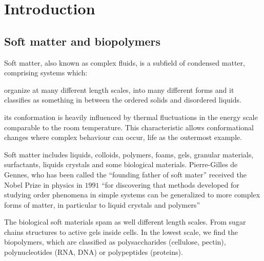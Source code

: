 
\chapter{Introduction} %

\label{Introduction} %



    
    

\section{Soft matter and biopolymers}
Soft matter, also known as complex fluids, is a subfield of condensed
matter, comprising systems which:
\begin{enumerate*}[label=\bfseries\alph*)]
 
\item organize at many different length scales, into
many different forms and it classifies as something in between the
ordered solids and disordered liquids.\
\item its conformation is heavily
influenced by thermal fluctuations in the energy scale comparable to the room
temperature. This characteristic allows conformational changes where complex
behaviour can occur, life as the outermost example.
\end{enumerate*}

Soft matter includes liquids, colloids, polymers, foams, gels, granular
materials, surfactants, liquids crystals and some biological materials.
Pierre-Gilles de Gennes, who has been called the ``founding father of soft
mater'' received the Nobel Prize in physics in $1991$ ``for discovering that 
methods developed for studying order phenomena in simple systems can be 
generalized to more complex forms of matter, in particular to liquid  crystals
and polymers''\citep{de_gennes_pierre-gilles_????}
 
The biological soft materials spam as well different length scales. From sugar
chains structures to active gels inside cells. In the
lowest scale, we find the biopolymers, which are classified as polysaccharides
(cellulose, pectin),  polynucleotides (RNA, DNA) or polypeptides (proteins).
 
